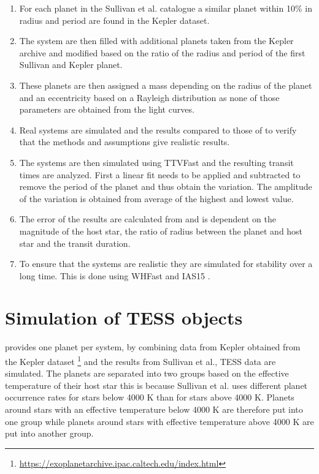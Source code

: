 \documentclass[12pt]{report}
\begin{document}
\begin{enumerate}
	\item For each planet in the Sullivan et al. catalogue a similar planet within 10\% in radius and period are found in the Kepler dataset.
	\item The system are then filled with additional planets taken from the Kepler archive and modified based on the ratio of the radius and period of the first Sullivan and Kepler planet.
	\item These planets are then assigned a mass depending on the radius of the planet \citep{2015ApJ...809...77S} and an eccentricity based on a Rayleigh distribution as none of those parameters are obtained from the light curves.
	\item Real systems are simulated and the results compared to those of \cite{2018ApJS..234....9O} to verify that the methods and assumptions give realistic results.
	\item The systems are then simulated using TTVFast \citep{2014ApJ...787..132D} and the resulting transit times are analyzed. First a linear fit needs to be applied and subtracted to remove the period of the planet and thus obtain the variation. The amplitude of the variation is obtained from average of the highest and lowest value.
	\item The error of the results are calculated from \cite{2005Sci...307.1288H} and is dependent on the magnitude of the host star, the ratio of radius between the planet and host star and the transit duration.
	\item To ensure that the systems are realistic they are simulated for stability over a long time. This is done using WHFast \citep{2015MNRAS.452..376R} and IAS15 \citep{2015MNRAS.446.1424R}.
\end{enumerate}

\section{Simulation of TESS objects}
\label{simTESS}
	\cite{2015ApJ...809...77S} provides one planet per system, by combining data from Kepler obtained from the Kepler dataset \footnote{\url{https://exoplanetarchive.ipac.caltech.edu/index.html}} and the results from Sullivan et al., TESS data are simulated. The planets are separated into two groups based on the effective temperature of their host star this is because Sullivan et al. uses different planet occurrence rates for stars below 4000 K than for stars above 4000 K. Planets around stars with an effective temperature below 4000 K are therefore put into one group while planets around stars with effective temperature above 4000 K are put into another group.
	
\end{document}
